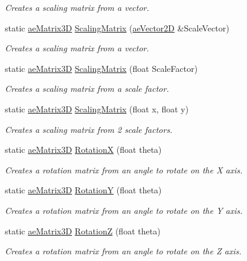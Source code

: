 \begin{DoxyCompactItemize}
\begin{DoxyCompactList}\small\item\em Creates a scaling matrix from a vector. \end{DoxyCompactList}\item 
static \hyperlink{structae_core_1_1ae_matrix3_d}{ae\+Matrix3D} \hyperlink{structae_core_1_1ae_matrix3_d_a46aaaa5fb611fce032caafff6d8f08ca}{Scaling\+Matrix} (\hyperlink{structae_core_1_1ae_vector2_d}{ae\+Vector2D} \&Scale\+Vector)
\begin{DoxyCompactList}\small\item\em Creates a scaling matrix from a vector. \end{DoxyCompactList}\item 
static \hyperlink{structae_core_1_1ae_matrix3_d}{ae\+Matrix3D} \hyperlink{structae_core_1_1ae_matrix3_d_aa7b87953127f0e5b7577612f6754908b}{Scaling\+Matrix} (float Scale\+Factor)
\begin{DoxyCompactList}\small\item\em Creates a scaling matrix from a scale factor. \end{DoxyCompactList}\item 
static \hyperlink{structae_core_1_1ae_matrix3_d}{ae\+Matrix3D} \hyperlink{structae_core_1_1ae_matrix3_d_a7d0d2cf7e270b015b9d49fb45b537024}{Scaling\+Matrix} (float x, float y)
\begin{DoxyCompactList}\small\item\em Creates a scaling matrix from 2 scale factors. \end{DoxyCompactList}\item 
static \hyperlink{structae_core_1_1ae_matrix3_d}{ae\+Matrix3D} \hyperlink{structae_core_1_1ae_matrix3_d_aed616a6e0eaaf87a636ccc4dd3792034}{RotationX} (float theta)
\begin{DoxyCompactList}\small\item\em Creates a rotation matrix from an angle to rotate on the X axis. \end{DoxyCompactList}\item 
static \hyperlink{structae_core_1_1ae_matrix3_d}{ae\+Matrix3D} \hyperlink{structae_core_1_1ae_matrix3_d_a3baa8623667da36c38cf7633c7d07dfd}{RotationY} (float theta)
\begin{DoxyCompactList}\small\item\em Creates a rotation matrix from an angle to rotate on the Y axis. \end{DoxyCompactList}\item 
static \hyperlink{structae_core_1_1ae_matrix3_d}{ae\+Matrix3D} \hyperlink{structae_core_1_1ae_matrix3_d_a5f5259d8c5086d9ec4bb895588072f89}{RotationZ} (float theta)
\begin{DoxyCompactList}\small\item\em Creates a rotation matrix from an angle to rotate on the Z axis. \end{DoxyCompactList}\end{DoxyCompactItemize}
